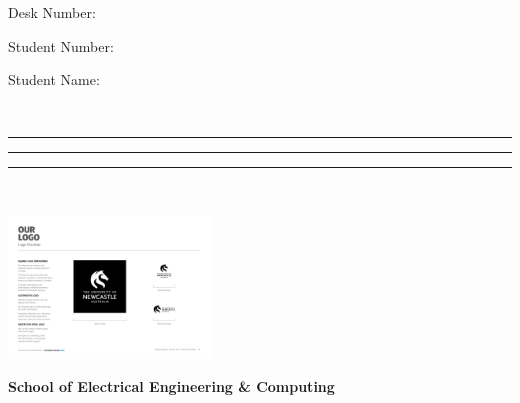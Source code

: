 \documentclass[a4paper,12pt]{article}
\begin{document}
\begin{doublespace}

  \vspace*{-10mm}


  \begin{minipage}[t]{0.23\linewidth}
    
    \footnotesize

    Desk Number:

    \vspace{0.5mm}

    Student Number:

    \vspace{0.5mm}

    Student Name: 

    {\ }
  \end{minipage}  \begin{minipage}[t]{0.4\linewidth}
    
    \footnotesize

    \rule{2cm}{0.2mm}

    \vspace{0.5mm}

    \rule{5cm}{0.2mm}

    \vspace{0.5mm}

    \rule{5cm}{0.2mm}

    {\ }
  \end{minipage}\hfill
  \begin{minipage}[b]{3.78cm}
    \hspace*{10mm}\includegraphics[height=3.78cm]{uon_logo_black_square.pdf}
    \vspace*{-3.78cm}
  \end{minipage}


  \vspace{20mm}



  \begin{center}
    \textbf{\large School of Electrical Engineering \& Computing}

    \vspace{1mm}


\end{center}
\end{doublespace}
\end{document}
